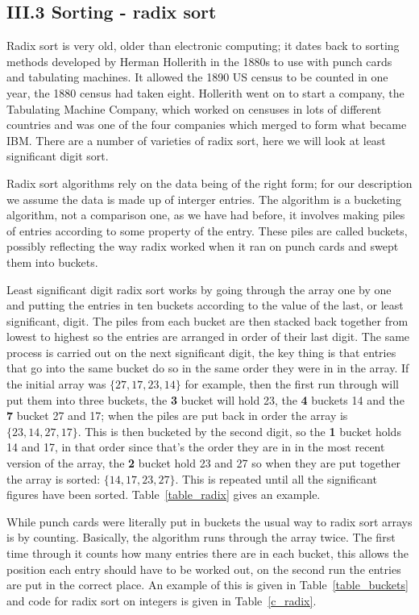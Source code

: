 \documentclass[11pt,a4paper]{scrartcl}
\begin{document}
\subsection*{III.3 Sorting - radix sort}

Radix sort is very old, older than electronic computing; it dates back
to sorting methods developed by Herman Hollerith in the 1880s to use
with punch cards and tabulating machines. It allowed the 1890 US
census to be counted in one year, the 1880 census had taken
eight. Hollerith went on to start a company, the Tabulating Machine
Company, which worked on censuses in lots of different countries and
was one of the four companies which merged to form what became
IBM. There are a number of varieties of radix sort, here we will look
at least significant digit sort. 

Radix sort algorithms rely on the data being of the right form; for
our description we assume the data is made up of interger entries. The
algorithm is a bucketing algorithm, not a comparison one, as we have
had before, it involves making piles of entries according to some
property of the entry. These piles are called buckets, possibly
reflecting the way radix worked when it ran on punch cards and swept
them into buckets.

Least significant digit radix sort works by going through the array
one by one and putting the entries in ten buckets according to the
value of the last, or least significant, digit. The piles from each
bucket are then stacked back together from lowest to highest so the
entries are arranged in order of their last digit. The same process is
carried out on the next significant digit, the key thing is that
entries that go into the same bucket do so in the same order they were
in in the array. If the initial array was $\{27,17,23,14\}$ for
example, then the first run through will put them into three buckets,
the {\bf 3} bucket will hold 23, the {\bf 4} buckets 14 and the {\bf
  7} bucket 27 and 17; when the piles are put back in order the array
is $\{23,14,27,17\}$. This is then bucketed by the second digit, so
the {\bf 1} bucket holds 14 and 17, in that order since that's the
order they are in in the most recent version of the array, the {\bf 2}
bucket hold 23 and 27 so when they are put together the array is
sorted: $\{14,17,23,27\}$. This is repeated until all the significant
figures have been sorted. Table~\ref{table_radix} gives an example.

While punch cards were literally put in buckets the usual way to radix
sort arrays is by counting. Basically, the algorithm runs through the
array twice. The first time through it counts how many entries there
are in each bucket, this allows the position each entry should have to
be worked out, on the second run the entries are put in the correct
place. An example of this is given in Table~\ref{table_buckets} and
code for radix sort on integers is given in Table~\ref{c_radix}.
\end{document}
